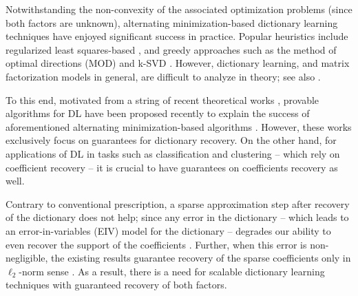 \documentclass{article}
\begin{document}
Notwithstanding the non-convexity of the associated optimization problems (since both factors are unknown),  alternating minimization-based dictionary learning techniques have enjoyed significant success in practice. Popular heuristics include regularized least squares-based \citep{Olshausen97,Lee2007,Mairal09, Lewicki2000, Kreutz2003}, and greedy approaches such as the method of optimal directions (MOD) \citep{Engan1999} and k-SVD \citep{ Aharon2006}. However, dictionary learning, and matrix factorization models in general, are difficult to analyze in theory; see also \cite{li2016symmetry}.



To this end, motivated from a string of recent theoretical works \citep{Remi2010, Jenatton2012, Geng2014}, provable algorithms for DL have been proposed recently to explain the success of aforementioned alternating minimization-based algorithms \citep{Agarwal14, Arora14, Arora15}. However, these works exclusively focus on guarantees for dictionary recovery. 
On the other hand, for applications of DL in tasks such as classification and clustering -- which rely on coefficient recovery -- it is crucial to have guarantees on coefficients recovery as well. 

Contrary to conventional prescription, a sparse approximation step after recovery of the dictionary does not help; since any error in the dictionary -- which leads to an error-in-variables (EIV) \citep{Fuller2009} model for the dictionary -- degrades our ability to even recover the support of the coefficients \citep{Wainwright2009}. Further, when this error is non-negligible, the existing results guarantee recovery of the sparse coefficients only in $\ell_2$-norm sense \citep{Donoho2006}. As a result, there is a need for scalable dictionary learning techniques with guaranteed recovery of both factors.
 

 
 
 

 
 

 
 













 
\end{document}
